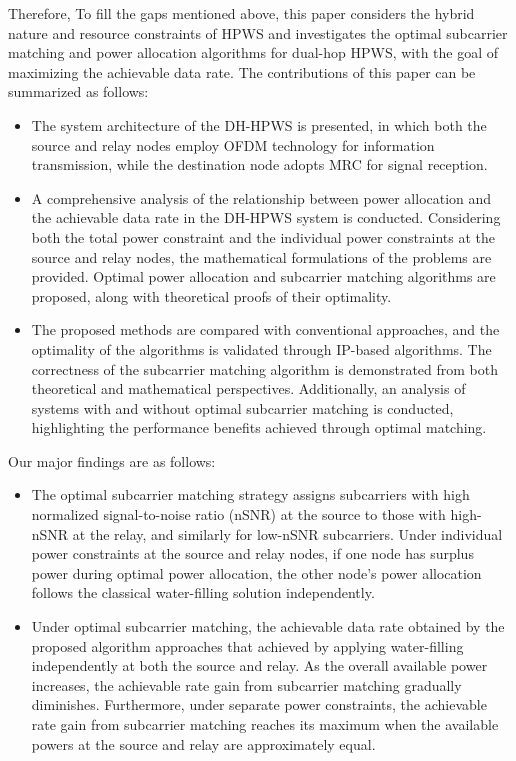 \documentclass[lettersize,journal]{IEEEtran}
\begin{document}
	Therefore, To fill the gaps mentioned above, this paper considers the hybrid nature and resource constraints of HPWS and investigates the optimal subcarrier matching and power allocation algorithms for dual-hop HPWS, with the goal of maximizing the achievable data rate. The contributions of this paper can be summarized as follows:
	\begin{itemize}
		\item The system architecture of the DH-HPWS is presented, in which both the source and relay nodes employ OFDM technology for information transmission, while the destination node adopts MRC for signal reception.
		\item A comprehensive analysis of the relationship between power allocation and the achievable data rate in the DH-HPWS system is conducted. Considering both the total power constraint and the individual power constraints at the source and relay nodes, the mathematical formulations of the problems are provided. Optimal power allocation and subcarrier matching algorithms are proposed, along with theoretical proofs of their optimality.
		\item The proposed methods are compared with conventional approaches, and the optimality of the algorithms is validated through IP-based algorithms. The correctness of the subcarrier matching algorithm is demonstrated from both theoretical and mathematical perspectives. Additionally, an analysis of systems with and without optimal subcarrier matching is conducted, highlighting the performance benefits achieved through optimal matching.
	\end{itemize}
	
	Our major findings are as follows:
	
	\begin{itemize}
		\item The optimal subcarrier matching strategy assigns subcarriers with high normalized signal-to-noise ratio (nSNR) at the source to those with high-nSNR at the relay, and similarly for low-nSNR subcarriers. Under individual power constraints at the source and relay nodes, if one node has surplus power during optimal power allocation, the other node's power allocation follows the classical water-filling solution independently.
		\item Under optimal subcarrier matching, the achievable data rate obtained by the proposed algorithm approaches that achieved by applying water-filling independently at both the source and relay. As the overall available power increases, the achievable rate gain from subcarrier matching gradually diminishes. Furthermore, under separate power constraints, the achievable rate gain from subcarrier matching reaches its maximum when the available powers at the source and relay are approximately equal.
	\end{itemize}
		
\end{document}
